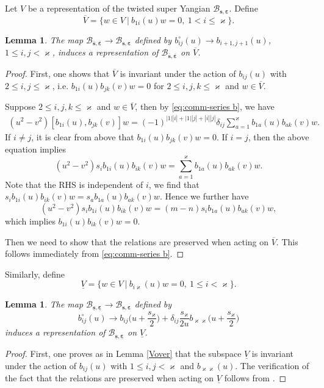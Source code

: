 \documentclass[11pt,reqno]{amsart}
\numberwithin{equation}{section}
\newtheorem{lem}[thm]{Lemma}
\theoremstyle{definition}
\theoremstyle{remark}
\newcommand{\beq}{\begin{equation}}
\newcommand{\eeq}{\end{equation}}
\newcommand{\lle}{\leqslant}
\newcommand{\ka}{\varkappa}
\newcommand{\ve}{\varepsilon}
\newcommand{\ovs}{{\overline{\bm s}}}
\newcommand{\ove}{{\overline{\bm \varepsilon}}}
\newcommand{\uns}{{\underline{\bm s}}}
\newcommand{\une}{{\underline{\bm \varepsilon}}}
\begin{document}
Let $V$ be a representation of the twisted super Yangian $\mathscr B_{\bm s,\bm \ve}$. Define
\beq\label{Vover}
\overline V=\{w\in V~|~ b_{1i}(u)w=0,\ 1<i\lle \ka\}.
\eeq
\begin{lem}\label{lem:embedding-over}
The map $\mathscr B_{\ovs,\ove}\to \mathscr B_{\bm s,\bm \ve}$ defined by ${b}^\circ_{ij}(u)\to b_{i+1,j+1}(u)$, $1\lle i,j<\ka$, induces a representation of $\mathscr B_{\ovs,\ove}$ on $\overline V$.
\end{lem}
\begin{proof}
First, one shows that $\overline V$ is invariant under the action of $b_{ij}(u)$ with $2\lle i,j\lle \ka$, i.e. $b_{1i}(u)b_{jk}(v)w=0$ for $2\lle i,j,k\lle \ka$ and $w\in \overline V$. 

Suppose $2\lle i,j,k\lle \ka$ and $w\in \overline V$, then by \eqref{eq:comm-series b}, we have 
\begin{align*}
(u^2-v^2)[b_{1i}(u),b_{jk}(v)]w=(-1)^{|1||i|+|1||j|+|i||j|}\delta_{ij}\sum_{a=1}^\ka b_{1a}(u)b_{ak}(v)w.
\end{align*}
If $i\ne j$, it is clear from above that $b_{1i}(u)b_{jk}(v)w=0$. If $i=j$, then the above equation implies
\[
(u^2-v^2)s_ib_{1i}(u)b_{ik}(v)w=\sum_{a=1}^\ka b_{1a}(u)b_{ak}(v)w.
\]
Note that the RHS is independent of $i$, we find that $s_ib_{1i}(u)b_{ik}(v)w=s_ab_{1a}(u)b_{ak}(v)w$. Hence we further have
\[
(u^2-v^2)s_ib_{1i}(u)b_{ik}(v)w=(m-n)s_ib_{1a}(u)b_{ak}(v)w,
\]
which implies $b_{1i}(u)b_{ik}(v)w=0$.

Then we need to show that the relations are preserved when acting on $\overline V$. This follows immediately from \eqref{eq:comm-series b}.
\end{proof}

Similarly, define
\beq\label{Vund}
\underline{V}=\{w\in V~|~ b_{i\ka}(u)w=0,\ 1\lle i<\ka\}.
\eeq
\begin{lem}\label{lem:embedding-under}
The map $\mathscr B_{\uns,\une}\to \mathscr B_{\bm s,\bm \ve}$ defined by
$$
b_{ij}^\circ(u)\to b_{ij}\Big(u+\frac{s_\ka}{2}\Big)+\delta_{ij}\frac{s_\ka}{2u}b_{\ka\ka}\Big(u+\frac{s_\ka}{2}\Big)
$$ induces a representation of $\mathscr B_{\uns,\une}$ on $\underline{V}$.
\end{lem}
\begin{proof}
First, one proves as in Lemma \ref{Vover} that the subspace $\underline V$ is invariant under the action of $b_{ij}(u)$ with $1\lle i,j<\ka$ and $b_{\ka\ka}(u)$. The verification of the fact that the relations are preserved when acting on $\underline V$ follows from \cite[Theorem 3.1]{Belliard2009nested}.
\end{proof}
\end{document}
